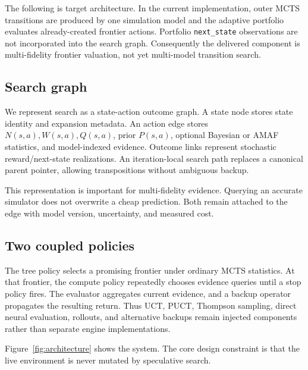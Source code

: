 \documentclass[10pt,twocolumn]{article}
\begin{document}
The following is target architecture. In the current implementation, outer
MCTS transitions are produced by one simulation model and the adaptive
portfolio evaluates already-created frontier actions. Portfolio
\texttt{next\_state} observations are not incorporated into the search graph.
Consequently the delivered component is multi-fidelity frontier valuation, not
yet multi-model transition search.

\subsection{Search graph}

We represent search as a state-action outcome graph. A state node stores state
identity and expansion metadata. An action edge stores
\(N(s,a),W(s,a),Q(s,a)\), prior \(P(s,a)\), optional Bayesian or AMAF
statistics, and model-indexed evidence. Outcome links represent stochastic
reward/next-state realizations. An iteration-local search path replaces a
canonical parent pointer, allowing transpositions without ambiguous backup.

This representation is important for multi-fidelity evidence. Querying an
accurate simulator does not overwrite a cheap prediction. Both remain attached
to the edge with model version, uncertainty, and measured cost.

\subsection{Two coupled policies}

The tree policy selects a promising frontier under ordinary MCTS statistics.
At that frontier, the compute policy repeatedly chooses evidence queries until
a stop policy fires. The evaluator aggregates current evidence, and a backup
operator propagates the resulting return. Thus UCT, PUCT, Thompson sampling,
direct neural evaluation, rollouts, and alternative backups remain injected
components rather than separate engine implementations.

Figure~\ref{fig:architecture} shows the system. The core design constraint is
that the live environment is never mutated by speculative search.
\end{document}
